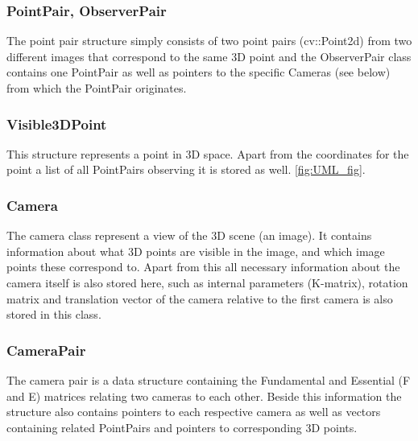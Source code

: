 \subsubsection{PointPair, ObserverPair}
The point pair structure simply consists of two point pairs (cv::Point2d) from two different images that correspond to the same 3D point and the ObserverPair class contains one PointPair as well as pointers to the specific Cameras (see below) from which the PointPair originates. 

\subsubsection{Visible3DPoint}
This structure represents a point in 3D space. Apart from the coordinates for the point a list of all PointPairs observing it is stored as well.  \ref{fig:UML_fig}. %

\subsubsection{Camera}
The camera class represent a view of the 3D scene (an image). It contains information about what 3D points are visible in the image, and which image points these correspond to. Apart from this all necessary information about the camera itself is also stored here, such as internal parameters (K-matrix), rotation matrix and translation vector of the camera relative to the first camera is also stored in this class.

\subsubsection{CameraPair}
The camera pair is a data structure containing the Fundamental and Essential (F and E) matrices relating two cameras to each other. Beside this information the structure also contains pointers to each respective camera as well as vectors containing related PointPairs and pointers to corresponding 3D points.